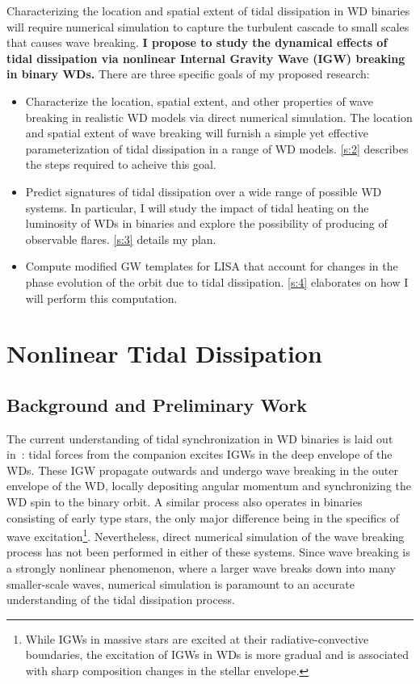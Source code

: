 \documentclass[12pt,
        usenames, %
        dvipsnames %
    ]{article}
\begin{document}
Characterizing the location and spatial extent of tidal dissipation in WD
binaries will require numerical simulation to capture the turbulent cascade to
small scales that causes wave breaking. \textbf{I propose to study the dynamical
effects of tidal dissipation via nonlinear Internal Gravity Wave (IGW) breaking
in binary WDs.} There are three specific goals of my proposed research:
\begin{itemize}
    \item Characterize the location, spatial extent, and other properties of
        wave breaking in realistic WD models via direct numerical simulation.
        The location and spatial extent of wave breaking will furnish a simple
        yet effective parameterization of tidal dissipation in a range of WD
        models. \autoref{s:2} describes the steps required to acheive this goal.

    \item Predict signatures of tidal dissipation over a wide range of possible
        WD systems. In particular, I will study the impact of tidal heating
        on the luminosity of WDs in binaries and explore the possibility of
        producing of observable flares. \autoref{s:3} details my plan.

    \item Compute modified GW templates for LISA that account for changes in the
        phase evolution of the orbit due to tidal dissipation. \autoref{s:4}
        elaborates on how I will perform this computation.
\end{itemize}

\section{Nonlinear Tidal Dissipation}\label{s:2}

\subsection{Background and Preliminary Work}

The current understanding of tidal synchronization in WD binaries is laid out
in~\cite{fullerII}: tidal forces from the companion excites IGWs in the deep
envelope of the WDs. These IGW propagate outwards and undergo wave breaking in
the outer envelope of the WD, locally depositing angular momentum and
synchronizing the WD spin to the binary orbit. A similar process also
operates in binaries consisting of early type stars\cite{zahn75,gn89},
the only major difference being in the specifics of wave
excitation\footnote{While IGWs in massive stars are excited at their
radiative-convective boundaries, the excitation of IGWs in WDs is more gradual
and is associated with sharp composition changes in the stellar
envelope\cite{fullerII}.}. Nevertheless, direct numerical simulation of the wave
breaking process has not been performed in either of these systems. Since wave
breaking is a strongly nonlinear phenomenon, where a larger wave breaks down
into many smaller-scale waves, numerical simulation is paramount to an accurate
understanding of the tidal dissipation process.
\end{document}
